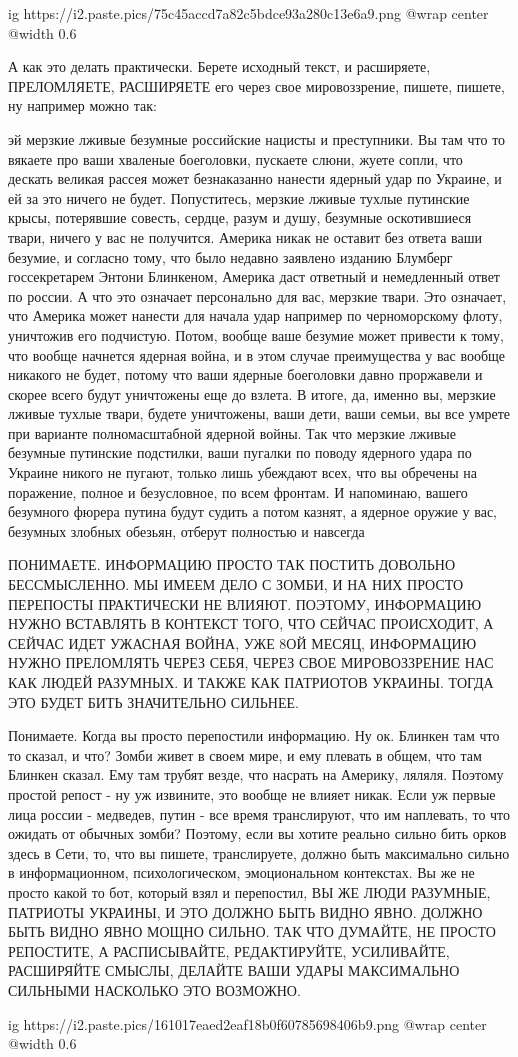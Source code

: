 \ifcmt
  ig https://i2.paste.pics/75c45accd7a82c5bdce93a280c13e6a9.png
  @wrap center
  @width 0.6
\fi

А как это делать практически. Берете исходный текст, и расширяете, ПРЕЛОМЛЯЕТЕ,
РАСШИРЯЕТЕ его через свое мировоззрение, пишете, пишете, ну например можно так:

эй мерзкие лживые безумные российские нацисты и преступники. Вы там что то
вякаете про ваши хваленые боеголовки, пускаете слюни, жуете сопли, что дескать
великая рассея может безнаказанно нанести ядерный удар по Украине, и ей за это
ничего не будет. Попуститесь, мерзкие лживые тухлые путинские крысы, потерявшие
совесть, сердце, разум и душу, безумные оскотившиеся твари, ничего у вас не
получится. Америка никак не оставит без ответа ваши безумие, и согласно тому,
что было недавно заявлено  изданию Блумберг госсекретарем Энтони Блинкеном,
Америка даст ответный и немедленный ответ по россии. А что это означает
персонально для вас, мерзкие твари. Это означает, что Америка может нанести для
начала удар например по черноморскому флоту, уничтожив его подчистую. Потом,
вообще ваше безумие может привести к тому, что вообще начнется ядерная война, и
в этом случае преимущества у вас вообще никакого не будет, потому что ваши
ядерные боеголовки давно проржавели и скорее всего будут уничтожены еще до
взлета. В итоге, да, именно вы, мерзкие лживые тухлые твари, будете уничтожены,
ваши дети, ваши семьи, вы все умрете при варианте полномасштабной ядерной
войны. Так что мерзкие лживые безумные путинские подстилки, ваши пугалки по
поводу ядерного удара по Украине никого не пугают, только лишь убеждают всех,
что вы обречены на поражение, полное и безусловное, по всем фронтам. И
напоминаю, вашего безумного фюрера путина будут судить а потом казнят, а
ядерное оружие у вас, безумных злобных обезьян, отберут полностью и навсегда

ПОНИМАЕТЕ. ИНФОРМАЦИЮ ПРОСТО ТАК ПОСТИТЬ ДОВОЛЬНО БЕССМЫСЛЕННО. МЫ ИМЕЕМ ДЕЛО С
ЗОМБИ, И НА НИХ ПРОСТО ПЕРЕПОСТЫ ПРАКТИЧЕСКИ НЕ ВЛИЯЮТ. ПОЭТОМУ, ИНФОРМАЦИЮ
НУЖНО ВСТАВЛЯТЬ В КОНТЕКСТ ТОГО, ЧТО СЕЙЧАС ПРОИСХОДИТ, А СЕЙЧАС ИДЕТ УЖАСНАЯ
ВОЙНА, УЖЕ 8ОЙ МЕСЯЦ, ИНФОРМАЦИЮ НУЖНО ПРЕЛОМЛЯТЬ ЧЕРЕЗ СЕБЯ, ЧЕРЕЗ СВОЕ
МИРОВОЗЗРЕНИЕ НАС КАК ЛЮДЕЙ РАЗУМНЫХ. И ТАКЖЕ КАК ПАТРИОТОВ УКРАИНЫ. ТОГДА ЭТО
БУДЕТ БИТЬ ЗНАЧИТЕЛЬНО СИЛЬНЕЕ.

Понимаете. Когда вы просто перепостили информацию. Ну ок. Блинкен там что то
сказал, и что? Зомби живет в своем мире, и ему плевать в общем, что там Блинкен
сказал. Ему там трубят везде, что насрать на Америку, ляляля. Поэтому простой
репост - ну уж извините, это вообще не влияет никак. Если уж первые лица россии
- медведев, путин - все время транслируют, что им наплевать, то что ожидать от
обычных зомби? Поэтому, если вы хотите реально сильно бить орков здесь в Сети,
то, что вы пишете, транслируете, должно быть максимально сильно в
информационном, психологическом, эмоциональном контекстах. Вы же не просто
какой то бот, который взял и перепостил, ВЫ ЖЕ ЛЮДИ РАЗУМНЫЕ, ПАТРИОТЫ УКРАИНЫ,
И ЭТО ДОЛЖНО БЫТЬ ВИДНО ЯВНО. ДОЛЖНО БЫТЬ ВИДНО ЯВНО МОЩНО СИЛЬНО. ТАК ЧТО
ДУМАЙТЕ, НЕ ПРОСТО РЕПОСТИТЕ, А РАСПИСЫВАЙТЕ, РЕДАКТИРУЙТЕ, УСИЛИВАЙТЕ,
РАСШИРЯЙТЕ СМЫСЛЫ, ДЕЛАЙТЕ ВАШИ УДАРЫ МАКСИМАЛЬНО СИЛЬНЫМИ НАСКОЛЬКО ЭТО
ВОЗМОЖНО. 

\ifcmt
  ig https://i2.paste.pics/161017eaed2eaf18b0f60785698406b9.png
  @wrap center
  @width 0.6
\fi

